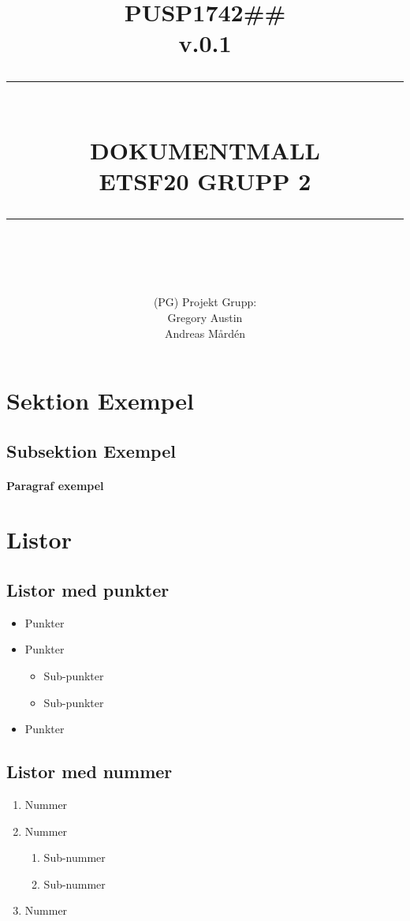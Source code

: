 \documentclass[paper=a4, fontsize=11pt,twoside]{article}
\title{ 														%
	\documentNumber{#1}											%
	\documentVersion{#2}											%
	\HRule{0.5pt} \\ %
	\LARGE \textbf{\uppercase{#3}} \\  									%
	\large \textbf{\uppercase{ETSF20 Grupp 2}}							%
	\HRule{2pt} \\ [0.5cm]      	%
	\normalsize          		%
	}															%
\author{#4}													%
\date{}                                           	%
\newcommand{\HRule}[1]{\rule{\linewidth}{#1}}   							%
\newcommand{\documentNumber}[1]{\centering PUSP1742#1 \\[1.0cm]}	 		%
\newcommand{\documentVersion}[1]{\centering \small{v.#1} \\[1.0cm]}	 		%
\newcommand{\grouptitlepage}[4]{										%
	\title{ 														%
	\documentNumber{#1}											%
	\documentVersion{#2}											%
	\HRule{0.5pt} \\ %
	\LARGE \textbf{\uppercase{#3}} \\  									%
	\large \textbf{\uppercase{ETSF20 Grupp 2}}							%
	\HRule{2pt} \\ [0.5cm]      	%
	\normalsize          		%
	}															%
	\author{#4}													%
	\maketitle														%
	\tableofcontents												%
	\thispagestyle{empty} 											%
	\newpage														%
}																%
\begin{document}
\grouptitlepage
{\#\#	}
{0.1}
{Dokumentmall}
{(PG) Projekt Grupp: \\ Gregory Austin \\ Andreas Mårdén}	

\section{Sektion Exempel}
\lipsum[1]

\subsection{Subsektion Exempel}

\paragraph{Paragraf exempel}
\lipsum[2]

\section{Listor}

\subsection{Listor med punkter}

\begin{itemize}
\item Punkter
\item Punkter
	\begin{itemize}
	\item Sub-punkter
	\item Sub-punkter
	\end{itemize}
\item Punkter
\end{itemize}

\subsection{Listor med nummer}

\begin{enumerate}
\item Nummer
\item Nummer
	\begin{enumerate}
	\item Sub-nummer
	\item Sub-nummer
	\end{enumerate}
\item Nummer
\end{enumerate}
\end{document}
